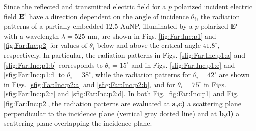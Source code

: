 Since the reflected and transmitted electric field for a $p$ polarized incident electric field $\vb{E}^\text{i}$ have a direction dependent on the angle of incidence $\theta_i$, the radiation patterns of a partially embedded  12.5 AuNP, illuminated by a  $p$ polarized  $\vb{E}^\text{i}$ with a wavelength $\lambda = 525$ nm, are shown in Figs. \ref{fig:Far:Inc:p1} and  \ref{fig:Far:Inc:p2} for values of $\theta_i$ below and above the critical angle $41.8^\circ$, respectively. In particular, the radiation patterns in Figs. \ref{sfig:Far:Inc:p1:a} and  \ref{sfig:Far:Inc:p1:b} corresponds to $\theta_i = 15^\circ$ and in Figs. \ref{sfig:Far:Inc:p1:c} and  \ref{sfig:Far:Inc:p1:d} to  $\theta_i = 38^\circ$, while the radiation patterns for  $\theta_i = 42^\circ$ are shown in  Figs. \ref{sfig:Far:Inc:p2:a} and  \ref{sfig:Far:Inc:p2:b}, and for $\theta_i = 75^\circ$ in  Figs. \ref{sfig:Far:Inc:p2:c} and  \ref{sfig:Far:Inc:p2:d}. In both Fig. \ref{fig:Far:Inc:p1} and Fig. \ref{fig:Far:Inc:p2}, the radiation patterns are evaluated at \textbf{a,c)}  a scattering plane perpendicular to the incidence plane (vertical gray dotted line) and  at \textbf{b,d)}  a scattering plane overlapping the incidence plane.

